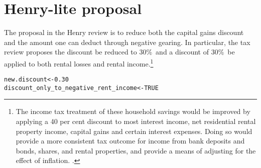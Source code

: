 \documentclass{grattan}\usepackage[]{graphicx}\usepackage[]{color}
\makeatletter
\newcommand{\hlnum}[1]{\textcolor[rgb]{0.686,0.059,0.569}{#1}}%
\newcommand{\hlstd}[1]{\textcolor[rgb]{0.345,0.345,0.345}{#1}}%
\newcommand{\hlkwb}[1]{\textcolor[rgb]{0.69,0.353,0.396}{#1}}%
\newenvironment{kframe}{%
 \def\at@end@of@kframe{}%
 \ifinner\ifhmode%
  \def\at@end@of@kframe{\end{minipage}}%
  \begin{minipage}{\columnwidth}%
 \fi\fi%
 \def\FrameCommand##1{\hskip\@totalleftmargin \hskip-\fboxsep
 \colorbox{shadecolor}{##1}\hskip-\fboxsep
     \hskip-\linewidth \hskip-\@totalleftmargin \hskip\columnwidth}%
 \MakeFramed {\advance\hsize-\width
   \@totalleftmargin\z@ \linewidth\hsize
   \@setminipage}}%
 {\par\unskip\endMakeFramed%
 \at@end@of@kframe}
\newenvironment{knitrout}{}{} %
\makeatother
\begin{document}
\onecolumn
\section{Henry-lite proposal}
The proposal in the Henry review is to reduce both the capital gains discount and the amount one can deduct through negative gearing. In particular, the tax review proposes the discount be reduced to 30\%\ and a discount of 30\%\ be applied to both rental losses and rental income.\footnote{The income tax treatment of these household savings would be improved by applying a
40 per cent discount to most interest income, net residential rental property income, capital
gains and certain interest expenses. Doing so would provide a more consistent tax
outcome for income from bank deposits and bonds, shares, and rental properties, and
provide a means of adjusting for the effect of inflation. \textcite{Treasury2010a}.}

\begin{knitrout}
\color{fgcolor}\begin{kframe}
\begin{alltt}
\hlstd{new.discount} \hlkwb{<-} \hlnum{0.30}
\hlstd{discount_only_to_negative_rent_income} \hlkwb{<-} \hlnum{TRUE}
\end{alltt}
\end{kframe}
\end{knitrout}
\end{document}
